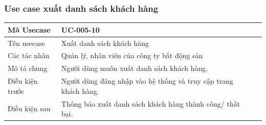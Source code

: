\documentclass[12pt,a4paper]{article}
\begin{document}
    \subsubsection*{Use case xuất danh sách khách hàng}
    \begin{table}[H]
        \centering
        \begin{tabular}{|p{3.5cm}|p{11.5cm}|c|}
            \hline
            Mã Usecase      & UC-005-10                                                       \\
            \hline
            Tên usecase     & Xuất danh sách khách hàng                                       \\
            \hline
            Các tác nhân    & Quản lý, nhân viên của công ty bất động sản                     \\
            \hline
            Mô tả chung     & Người dùng muốn xuất danh sách khách hàng.                      \\
            \hline

            Điều kiện trước & Người dùng đăng nhập vào hệ thống và truy cập trang khách hàng. \\
            \hline

            Điều kiện sau   & Thông báo xuất danh sách khách hàng thành công/ thất bại.       \\
            \hline


\end{tabular}
\end{table}
\end{document}
